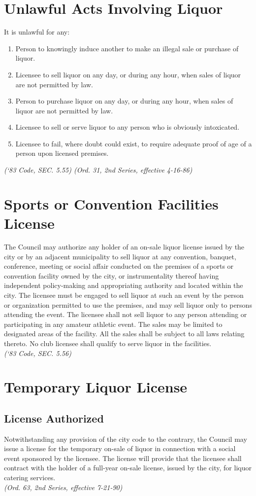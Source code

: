 \section{Unlawful Acts Involving Liquor}
It is unlawful for any:
\begin{enumerate}[{\indent}A)]
    \item Person to knowingly induce another to make an illegal sale or purchase of liquor.
    \item Licensee to sell liquor on any day, or during any hour, when sales of liquor are not permitted by law.
    \item Person to purchase liquor on any day, or during any hour, when sales of liquor are not permitted by law.
    \item Licensee to sell or serve liquor to any person who is obviously intoxicated.
    \item Licensee to fail, where doubt could exist, to require adequate proof of age of a person upon licensed premises.
\end{enumerate}
\emph{(‘83 Code, SEC. 5.55)  (Ord. 31, 2nd Series, effective 4-16-86)}
\section{Sports or Convention Facilities License}
The Council may authorize any holder of an on-sale liquor license issued by the city or by an adjacent municipality to sell liquor at any convention, banquet, conference, meeting or social affair conducted on the premises of a sports or convention facility owned by the city, or instrumentality thereof having independent policy-making and appropriating authority and located within the city.  The licensee must be engaged to sell liquor at such an event by the person or organization permitted to use the premises, and may sell liquor only to persons attending the event.  The licensee shall not sell liquor to any person attending or participating in any amateur athletic event.  The sales may be limited to designated areas of the facility.  All the sales shall be subject to all laws relating thereto.  No club licensee shall qualify to serve liquor in the facilities.\\
\emph{(‘83 Code, SEC. 5.56)}
\section{Temporary Liquor License}
\subsection{License Authorized}
Notwithstanding any provision of the city code to the contrary, the Council may issue a license for the temporary on-sale of liquor in connection with a social event sponsored by the licensee.  The license will provide that the licensee shall contract with the holder of a full-year on-sale license, issued by the city, for liquor catering services.\\
\emph{(Ord. 63, 2nd Series, effective 7-21-90)}
